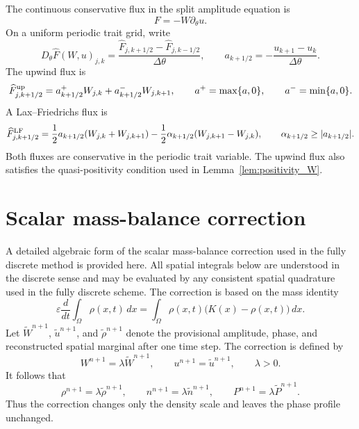 \documentclass[11pt]{article}
\begin{document}
The continuous conservative flux in the split amplitude equation is
\[
    F=-W\partial_\theta u.
\]
On a uniform periodic trait grid, write
\[
    D_\theta\widehat F(W,u)_{j,k}
    =\frac{\widehat F_{j,k+1/2}-\widehat F_{j,k-1/2}}{\Delta\theta},
    \qquad
    a_{k+1/2}=-\frac{u_{k+1}-u_k}{\Delta\theta}.
\]
The upwind flux is
\begin{equation}\label{eq:app_upwind_flux_new}
    \widehat F^{\rm up}_{j,k+1/2}
    =a_{k+1/2}^+ W_{j,k}+a_{k+1/2}^- W_{j,k+1},
    \qquad
    a^+=\max\{a,0\},
    \qquad
    a^-=\min\{a,0\}.
\end{equation}
A Lax--Friedrichs flux is
\begin{equation}\label{eq:app_LF_flux_new}
    \widehat F^{\rm LF}_{j,k+1/2}
    =\frac{1}{2}a_{k+1/2}(W_{j,k}+W_{j,k+1})
    -\frac{1}{2}\alpha_{k+1/2}(W_{j,k+1}-W_{j,k}),
    \qquad
    \alpha_{k+1/2}\ge |a_{k+1/2}|.
\end{equation}
Both fluxes are conservative in the periodic trait variable.  The upwind flux also satisfies the quasi-positivity condition used in Lemma~\ref{lem:positivity_W}.






\section{Scalar mass-balance correction}
\label{app:mass_correction}

A detailed algebraic form of the scalar mass-balance correction used in the
fully discrete method is provided here.  
All spatial integrals below are understood in the discrete sense and may be
evaluated by any consistent spatial quadrature used in the fully discrete
scheme.
The correction is based on the mass identity
\[
    \varepsilon \frac{d}{dt}\int_\Omega \rho(x,t)\,dx
    =
    \int_\Omega \rho(x,t)\bigl(K(x)-\rho(x,t)\bigr)\,dx .
\]
Let \(\widetilde W^{n+1}\), \(\widetilde u^{n+1}\), and
\(\widetilde\rho^{n+1}\) denote the provisional amplitude, phase, and
reconstructed spatial marginal after one time step.  The correction is defined
by
\[
    W^{n+1}=\lambda \widetilde W^{n+1},
    \qquad
    u^{n+1}=\widetilde u^{n+1},
    \qquad
    \lambda>0 .
\]
It follows that
\[
    \rho^{n+1}=\lambda\widetilde\rho^{n+1},
    \qquad
    n^{n+1}=\lambda\widetilde n^{n+1},
    \qquad
    P^{n+1}=\lambda\widetilde P^{n+1}.
\]
Thus the correction changes only the density scale and leaves the phase profile
unchanged.
\end{document}
